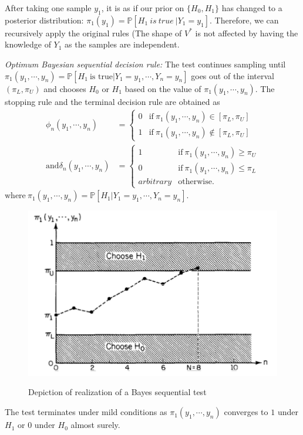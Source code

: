 \documentclass[12pt,a4paper]{article}
\newcommand{\te}{\textrm}
\begin{document}
After taking one sample $y_1$, it is as if our prior on $\{H_0,H_1\}$ has changed to a posterior distribution:
$\pi_1(y_1)=\mathbb{P}[H_1\ is\ true\ | Y_1=y_1]$. Therefore, we can recursively apply the original rules (The shape of $V^*$ is not affected by having the knowledge of $Y_1$ as the samples are independent.

\emph{Optimum Bayesian sequential decision rule:} The test continues sampling until $\pi_1(y_1,\cdots,y_n)=\mathbb{P}[H_1\ \te{is\ true}|Y_1=y_1,\cdots,Y_n=y_n]$ goes out of the interval $(\pi_L,\pi_U)$ and chooses $H_0$ or $H_1$ based on the value of $\pi_1(y_1,\cdots,y_n)$. The stopping rule and the terminal decision rule are obtained as
\begin{align}
\phi_n(y_1,\cdots,y_n)&= \begin{cases}0 &\text{if}\  \pi_1(y_1,\cdots,y_n)\in [\pi_L,\pi_U]\\1 &\text{if}\  \pi_1(y_1,\cdots,y_n)\notin [\pi_L,\pi_U]
\end{cases}\\ \te{and} \delta_n(y_1,\cdots,y_n)&= \begin{cases}1 & \text{if}\  \pi_1(y_1,\cdots,y_n)\geq \pi_U\\0  & \text{if}\  \pi_1(y_1,\cdots,y_n)\leq \pi_L\\arbitrary &  \text{otherwise.}\end{cases}
\end{align}
$\te{where}\ \pi_1(y_1,\cdots,y_n)=\mathbb{P}[H_1|Y_1=y_1,\cdots,Y_n=y_n]$.\\
\begin{figure}
\centering
\includegraphics[scale=0.7]{figures/bayesseqtest.png}\\
\caption{Depiction of realization of a Bayes sequential test}
\end{figure}

The test terminates under mild conditions as $\pi_1(y_1,\cdots,y_n)$ converges to $1$ under $H_1$ or $0$ under $H_0$ almost surely.
\end{document}
